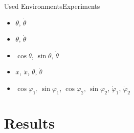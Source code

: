 \documentclass[
	aspectratio=43,
	color={accentcolor=1c},
	logo=false,
	colorframetitle=true,
]{tudabeamer}
\begin{document}
		\begin{frame}{Used Environments}{Experiments}
			\begin{itemize}
				\item {}            \qquad \(\theta\), \(\dot{\theta}\)
				\item {}     \qquad \(\theta\), \(\dot{\theta}\)
				\item {}        \qquad \(\cos\theta\), \(\sin\theta\), \(\dot{\theta}\)
				\item {}        \qquad \(x\), \(\dot{x}\), \(\theta\), \(\dot{\theta}\)
				\item {} \qquad \(\cos\varphi_1\), \(\sin\varphi_1\), \(\cos\varphi_2\), \(\sin\varphi_2\), \(\dot{\varphi}_1\), \(\dot{\varphi}_2\)
			\end{itemize}
		\end{frame}

	\section{Results}
\end{document}
